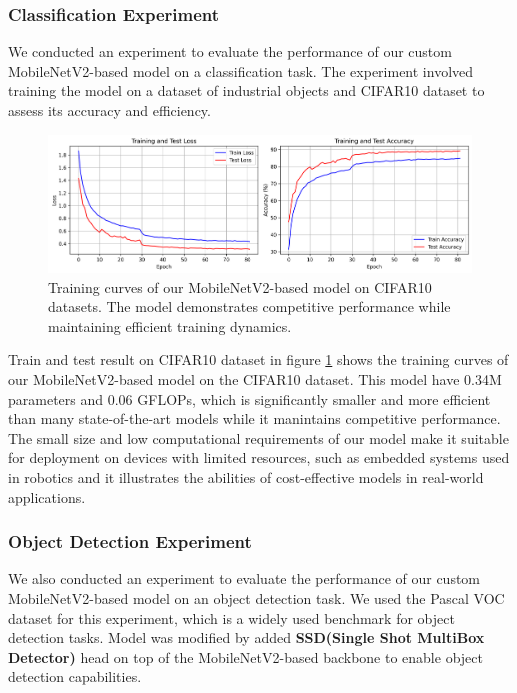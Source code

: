 \documentclass[conference]{IEEEtran}
\begin{document}
\subsubsection{Classification Experiment}

We conducted an experiment to evaluate the performance of our custom MobileNetV2-based model on a classification task. 
The experiment involved training the model on a dataset of industrial objects and CIFAR10\cite{krizhevsky2009learning} dataset to assess its accuracy and efficiency.
\begin{figure}[ht]
  \centering
  \includegraphics[width=.97\columnwidth]{340k_training_curves_postactive_W_autoaugments_2_2.png}
  \caption{Training curves of our MobileNetV2-based model on CIFAR10 datasets. The model demonstrates competitive performance while maintaining efficient training dynamics.}
  \label{fig:training-curves}
\end{figure}

Train and test result on CIFAR10 dataset in figure \ref{fig:training-curves} shows the training curves of our MobileNetV2-based model on the CIFAR10 dataset. 
This model have 0.34M parameters and 0.06 GFLOPs, which is significantly smaller and more efficient than many state-of-the-art models while it manintains competitive performance.
The small size and low computational requirements of our model make it suitable for deployment on devices with limited resources, such as embedded systems used in robotics and it illustrates the abilities of cost-effective models in real-world applications.

\subsubsection{Object Detection Experiment}

We also conducted an experiment to evaluate the performance of our custom MobileNetV2-based model on an object detection task.
We used the Pascal VOC\cite{everingham2010pascal} dataset for this experiment, which is a widely used benchmark for object detection tasks.
Model was modified by added \textbf{SSD(Single Shot MultiBox Detector)} head on top of the MobileNetV2-based backbone to enable object detection capabilities.
\end{document}
